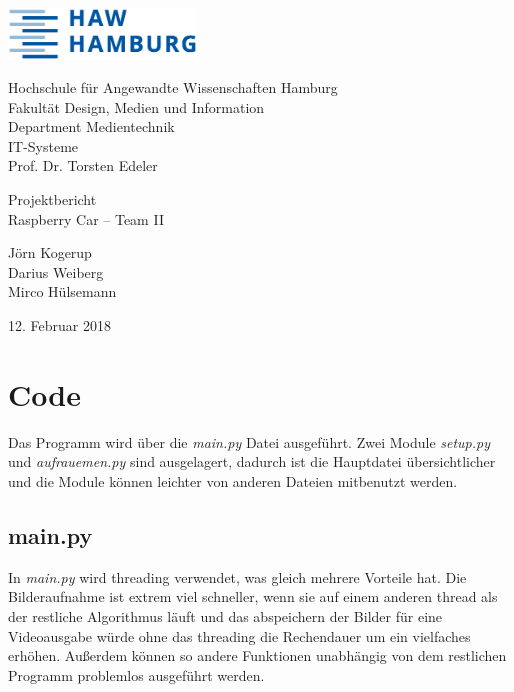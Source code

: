 \documentclass[a4paper, 12pt]{scrartcl}
\begin{document}
	\thispagestyle{empty}
	\begin{flushright}
		\includegraphics[width=5cm]{HAW_Logo.eps}
	\end{flushright}
	Hochschule für Angewandte Wissenschaften Hamburg\\
	Fakultät Design, Medien und Information\\
	Department Medientechnik\\[1ex]
	IT-Systeme\\
	Prof. Dr. Torsten Edeler
	
	\vspace{1cm}
	\begin{center}
		\large{Projektbericht}\\
		\LARGE{Raspberry Car -- Team II}
		
		\vspace{2ex}
		\large{	Jörn Kogerup\\
				Darius Weiberg\\
				Mirco Hülsemann}
		
		\vspace{2ex}
		\large{12. Februar 2018}
		
	\end{center}

\newpage
\tableofcontents
\newpage

\section{Code}

Das Programm wird über die \textit{main.py} Datei ausgeführt. Zwei Module \textit{setup.py} und \textit{aufrauemen.py} sind ausgelagert, dadurch ist die Hauptdatei übersichtlicher und die Module können leichter von anderen Dateien mitbenutzt werden.

\subsection{main.py}

In \textit{main.py} wird threading verwendet, was gleich mehrere Vorteile hat. Die Bilderaufnahme ist extrem viel schneller, wenn sie auf einem anderen thread als der restliche Algorithmus läuft und das abspeichern der Bilder für eine Videoausgabe würde ohne das threading die Rechendauer um ein vielfaches erhöhen. Außerdem können so andere Funktionen unabhängig von dem restlichen Programm problemlos ausgeführt werden.
\end{document}

